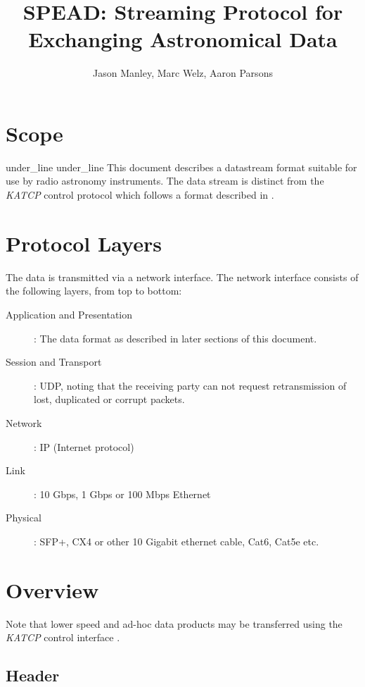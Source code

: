 \documentclass[11pt,english,twoside]{article}
\begin{document}
\title{SPEAD: Streaming Protocol for Exchanging Astronomical Data}
\author{Jason Manley, Marc Welz, Aaron Parsons}


\section{Scope}

under\_line under\_line
This document describes a datastream format suitable for use by radio astronomy instruments. The data stream is distinct from the \emph{KATCP} control protocol which follows a format described in \cite{ffdbectl}. 

\section{Protocol Layers}

The data is transmitted via a network interface. The network interface consists of the following layers, from top to bottom:

\begin{description}

\item[Application and Presentation]: The data format as described in later sections of this document.

\item[Session and Transport]: UDP, noting that the receiving party can not request retransmission of lost, duplicated or corrupt packets.

\item[Network]: IP (Internet protocol)

\item[Link]: 10 Gbps, 1 Gbps or 100 Mbps Ethernet

\item[Physical]: SFP+, CX4 or other 10 Gigabit ethernet cable, Cat6, Cat5e etc.

\end{description}

\section{Overview}

Note that lower speed and ad-hoc data products may be transferred using the \emph{KATCP} control interface \cite{ffdbectl}.

\subsection{Header}
\end{document}
